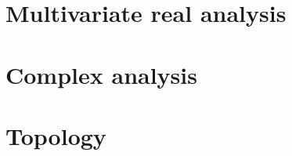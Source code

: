\documentclass[oneside]{book}
\begin{document}
\part{Multivariate real analysis}








\part{Complex analysis}



\part{Topology}










\end{document}

